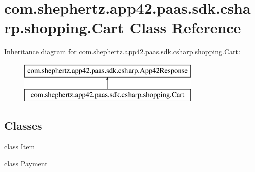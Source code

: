 \hypertarget{classcom_1_1shephertz_1_1app42_1_1paas_1_1sdk_1_1csharp_1_1shopping_1_1_cart}{\section{com.\+shephertz.\+app42.\+paas.\+sdk.\+csharp.\+shopping.\+Cart Class Reference}
\label{classcom_1_1shephertz_1_1app42_1_1paas_1_1sdk_1_1csharp_1_1shopping_1_1_cart}
}
Inheritance diagram for com.\+shephertz.\+app42.\+paas.\+sdk.\+csharp.\+shopping.\+Cart\+:\begin{figure}[H]
\begin{center}
\leavevmode
\includegraphics[height=2.000000cm]{classcom_1_1shephertz_1_1app42_1_1paas_1_1sdk_1_1csharp_1_1shopping_1_1_cart}
\end{center}
\end{figure}
\subsection*{Classes}
\begin{DoxyCompactItemize}
\item 
class \hyperlink{classcom_1_1shephertz_1_1app42_1_1paas_1_1sdk_1_1csharp_1_1shopping_1_1_cart_1_1_item}{Item}
\item 
class \hyperlink{classcom_1_1shephertz_1_1app42_1_1paas_1_1sdk_1_1csharp_1_1shopping_1_1_cart_1_1_payment}{Payment}
\end{DoxyCompactItemize}
